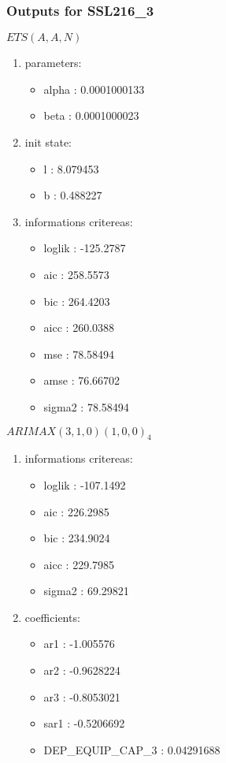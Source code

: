 \documentclass[10pt,a4paper]{article}\usepackage[]{graphicx}\usepackage[]{color}
\newcommand{\AaA}{\_}
\begin{document}
\subsubsection{Outputs for SSL216\AaA 3}
\begin{multicols}{2}


$ ETS(A,A,N) $
\begin{enumerate}
\item parameters:
\begin{itemize}
\item  alpha :  0.0001000133 
\item  beta :  0.0001000023 
\end{itemize}
\item init state:
\begin{itemize}
\item  l :  8.079453 
\item  b :  0.488227 
\end{itemize}
\item informations critereas:
\begin{itemize}
\item  loglik :  -125.2787 
\item  aic :  258.5573 
\item  bic :  264.4203 
\item  aicc :  260.0388 
\item  mse :  78.58494 
\item  amse :  76.66702 
\item  sigma2 :  78.58494 
\end{itemize}
\end{enumerate}

\columnbreak


 $ARIMAX(3,1,0)(1,0,0)_{4}$ 
\begin{enumerate}
\item informations critereas:
\begin{itemize}
\item  loglik :  -107.1492 
\item  aic :  226.2985 
\item  bic :  234.9024 
\item  aicc :  229.7985 
\item  sigma2 :  69.29821 
\end{itemize}

\item coefficients:
\begin{itemize}
\item  ar1 :  -1.005576 
\item  ar2 :  -0.9628224 
\item  ar3 :  -0.8053021 
\item  sar1 :  -0.5206692 
\item  DEP\AaA EQUIP\AaA CAP\AaA 3 :  0.04291688 
\end{itemize}
\end{enumerate}
\end{multicols}
\end{document}
